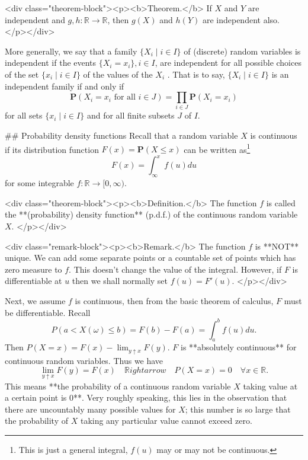 <div class="theorem-block"><p><b>Theorem.</b> 
If $X$ and $Y$ are independent and $g, h: \mathbb{R} \to \mathbb{R}$, then $g(X)$ and $h(Y)$ are independent also. 
</p></div>

More generally, we say that a family $\{ X_i \;\vert\; i \in I\}$ of (discrete) random variables is independent if the events $\{X_i = x_i \}, i \in I$, are independent for all possible choices of the set $\{x_i \;\vert\; i \in I\}$ of the values of the $X_i$ . That is to say, $\{X_i \;\vert\; i \in I \}$ is an independent family if and only if 
$$\begin{equation}
    \mathbf{P}(X_i = x_i \text{ for all }i\in J) = \prod_{i\in J} \mathbf{P}(X_i = x_i)
\end{equation}$$
for all sets $\{x_i \;\vert\; i \in I\}$ and for all finite subsets $J$ of $I$.


## Probability density functions
Recall that a random variable $X$ is continuous if its distribution function $F(x) = \mathbf{P}(X \leq x)$ can be written as\footnote{This is just a general integral, $f(u)$ may or may not be continuous.}
$$\begin{equation}
    F(x) = \int_{\infty}^x f(u)du
\end{equation}$$
for some integrable $f: \mathbb{R} \to [0, \infty)$.

<div class="theorem-block"><p><b>Definition.</b> 
The function $f$ is called the **(probability) density function** (p.d.f.) of the continuous random variable $X$. 
</p></div>

<div class="remark-block"><p><b>Remark.</b> 
The function $f$ is **NOT** unique. We can add some separate points or a countable set of points which has zero measure to $f$. This doesn't change the value of the integral. However, if $F$ is differentiable at $u$ then we shall normally set $f(u) = F'(u)$. 
</p></div>

Next, we assume $f$ is continuous, then from the basic theorem of calculus, $F$ must be differentiable. Recall 
$$\begin{equation}
    P(a < X(\omega) \leq b) = F(b) - F(a) = \int_{a}^b f(u)du.
\end{equation}$$
Then $P(X=x) = F(x) - \lim_{y \uparrow x} F(y)$. $F$ is **absolutely continuous** for continuous random variables. Thus we have
$$\begin{equation}
    \lim_{y\uparrow x} F(y) = F(x) \quad \mathbb{R}ightarrow \quad P(X=x) = 0 \quad \forall x\in\mathbb{R}.
\end{equation}$$
This means **the probability of a continuous random variable $X$ taking value at a certain point is 0**. Very roughly speaking, this lies in the observation that there are uncountably many possible values for $X$; this number is so large that the probability of $X$ taking any particular value cannot exceed zero. 

